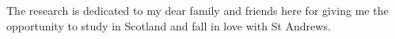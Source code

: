 \begin{dedication}
The research is dedicated to my dear family and friends here for giving me the opportunity to study in Scotland and fall in love with St Andrews.
\end{dedication}
